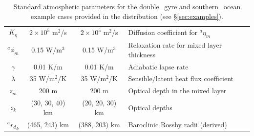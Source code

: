 \documentclass[11pt, a4paper,twoside]{article}
\newcommand{\etb}[2]{{{}^{#1}\eta_{#2}}}
\newcommand{\lb}[2]{{{}^{#1}\phi_{#2}}}
\numberwithin{equation}{section}
\begin{document}
\begin{table}[!t]
\begin{center}
\begin{tabular}{cccl}
$K_{\eta}$ & $2 \times 10^5$ m${}^2$/s & $2 \times 10^5$ m${}^2$/s & Diffusion coefficient for $\etb{a}{m}$\\
$\lb{a}{m}$ & 0.15 W/m${}^3$&0.15 W/m${}^3$& Relaxation rate for mixed layer thickness\\
$\gamma$ & 0.01 K/m &0.01 K/m & Adiabatic lapse rate\\
$\lambda$ & 35 W/m${}^2$/K &35 W/m${}^2$/K & Sensible/latent heat flux coefficient\\
$z_m$ & 200 m& 200 m& Optical depth in the mixed layer\\
$z_k$ & (30, 30, 40) km&(20, 20, 30) km& Optical depths\\
${}^a{r_d}_k$ & (465, 243) km & (388, 203) km &Baroclinic Rossby radii (derived)\\
\hline
    \end{tabular}
  \end{center}
\caption{\small Standard atmospheric parameters for the double\_gyre and southern\_ocean example cases provided in the distribution (see \S\ref{sec:examples}). \label{tab:atm}}
\end{table}
\end{document}
